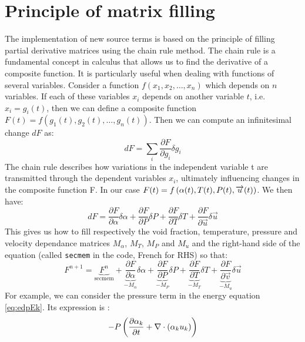 \section{Principle of matrix filling}\label{archi:matrix}
The implementation of new source terms is based on the principle of filling partial derivative matrices using the chain rule method. The chain rule is a fundamental concept in calculus that allows us to find the derivative of a composite function. It is particularly useful when dealing with functions of several variables.
Consider a function $f\left(x_1,x_2,\ldots,x_n\right)$ which depends on $n$ variables. If each of these variables $x_i$ depends on another variable $t$, i.e. $x_i=g_i\left(t\right)$, then we can define a composite function $F\left(t\right)=f\left(g_1\left(t\right),g_2\left(t\right),\ldots,g_n\left(t\right)\right)$. Then we can compute an infinitesimal change $dF$ as:
\begin{equation}
dF = \sum_i \frac{\partial F}{\partial g_i} \delta g_i
\end{equation}
The chain rule describes how variations in the independent variable t are transmitted through the dependent variables $x_i$, ultimately influencing changes in the composite function F.
In our case $F(t)=f\left( \alpha(t), T(t), P(t), \overrightarrow{u}(t) \right)$. We then have: 
\begin{equation}
dF=\frac{\partial F}{\partial \alpha} \delta \alpha +  \frac{\partial F}{\partial P} \delta P + \frac{\partial F}{\partial T} \delta T + \frac{\partial F}{\partial \vec{u}} \delta \vec{u}
\end{equation}
This gives us how to fill respectively the void fraction, temperature, pressure and velocity dependance matrices $M_\alpha$, $M_{T}$, $M_{P}$ and $M_u$ and the right-hand side of the equation (called \texttt{secmem} in the code, French for RHS) so that: 
\begin{equation}
F^{n+1}=\underbrace{F^{n}}_{\text{secmem}} + \underbrace{\frac{\partial F}{\partial \alpha}}_{-M_\alpha} \delta \alpha +  \underbrace{\frac{\partial F}{\partial P}}_{-M_{P}} \delta P +\underbrace{ \frac{\partial F}{\partial T}}_{-M_{T}} \delta T + \underbrace{\frac{\partial F}{\partial \vec{v}}}_{-M_{u}} \delta \vec{u}
\end{equation}
For example, we can consider the pressure term in the energy equation \ref{eq:edpEk}. Its expression is :
\begin{equation}
    -P\left( \frac{\partial \alpha_k}{\partial t}+\nabla \cdot (\alpha_k u_k) \right)
\end{equation}
